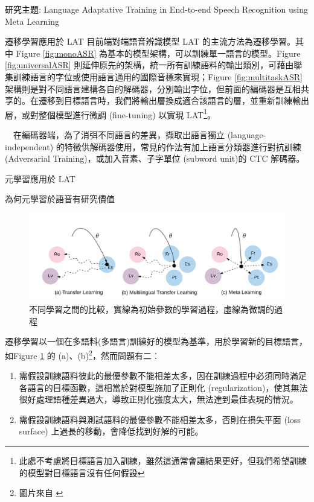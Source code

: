 \documentclass[12pt,UTF8,fntef]{article}
\begin{document}
\begin{section}{研究主題: Language Adaptative Training in End-to-end Speech Recognition using Meta Learning}
\begin{subsection}{遷移學習應用於 LAT}
  目前端對端語音辨識模型 LAT 的主流方法為遷移學習。其中 Figure \ref{fig:monoASR} 為基本的模型架構，可以訓練單一語言的模型。Figure \ref{fig:universalASR} 則延伸原先的架構，統一所有訓練語料的輸出類別，可藉由聯集訓練語言的字位或使用語言通用的國際音標來實現；Figure \ref{fig:multitaskASR} 架構則是對不同語言建構各自的解碼器，分別輸出字位，但前面的編碼器是互相共享的。在遷移到目標語言時，我們將輸出層換成適合該語言的層，並重新訓練輸出層，或對整個模型進行微調 (fine-tuning) 以實現 LAT\footnote{此處不考慮將目標語言加入訓練，雖然這通常會讓結果更好，但我們希望訓練的模型對目標語言沒有任何假設}。

~~在編碼器端，為了消弭不同語言的差異，擷取出語言獨立 (language-independent) 的特徵供解碼器使用，常見的作法有加上語言分類器進行對抗訓練 (Adversarial Training)，或加入音素、子字單位 (subword unit)的 CTC 解碼器。
  \end{subsection}

  \begin{subsection}{元學習應用於 LAT}
    \begin{subsubsection}{為何元學習於語音有研究價值}

  \begin{figure}[ht]
      \centering
      \includegraphics[width=0.8\linewidth]{Meta-motivation.png}
      \caption{不同學習之間的比較，實線為初始參數的學習過程，虛線為微調的過程}
      \label{fig:motivation}
  \end{figure}

  遷移學習以一個在多語料(多語言)訓練好的模型為基準，用於學習新的目標語言，如Figure \ref{fig:motivation} 的 (a)、(b)\footnote{圖片來自 \cite{gu2018meta}}，然而問題有二︰
      \begin{enumerate}[itemsep=-1mm]
        \item 需假設訓練語料彼此的最優參數不能相差太多，因在訓練過程中必須同時滿足各語言的目標函數，這相當於對模型施加了正則化 (regularization)，使其無法很好處理語種差異過大，導致正則化強度太大，無法達到最佳表現的情況。
        \item 需假設訓練語料與測試語料的最優參數不能相差太多，否則在損失平面 (loss surface) 上過長的移動，會降低找到好解的可能。 
      \end{enumerate}


\end{subsubsection}
\end{subsection}
\end{section}
\end{document}

